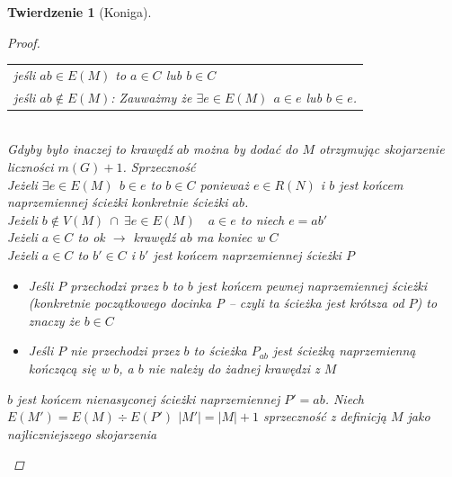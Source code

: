 \documentclass[12pt,a4paper]{article}
\newtheorem{tw}{Twierdzenie}
\theoremstyle{definition}
\begin{document}
\begin{tw}[Koniga]
\begin{proof}
\begin{enumerate}
\begin{tabular}{l}
		jeśli $ab\in E(M)$ to $a\in C$ lub $b\in C$	\\
		jeśli $ab\not\in E(M)$: Zauważmy że $\exists e\in E(M) ~~ a\in e$ lub $b\in e$.
	\end{tabular}\\
	 Gdyby było inaczej to krawędź $ab$ można by dodać do $M$ otrzymując skojarzenie liczności $m(G)+1$. Sprzeczność \\
	 Jeżeli $\exists e\in E(M) ~~ b\in e $ to $b\in C$ ponieważ $e\in R(N)$ i $b$ jest końcem naprzemiennej ścieżki konkretnie ścieżki $ab$.\\
	 Jeżeli $b\not\in V(M)~ \cap ~\exists e\in E(M) \quad a\in e$ to niech $e = ab'$\\
	 Jeżeli $a\in C$ to ok $\rightarrow$ krawędź $ab$ ma koniec w $C$\\
	 Jeżeli $a\in C$ to  $b'\in C$ i $b'$ jest końcem naprzemiennej ścieżki $P$
	 \begin{itemize}
	 	\item Jeśli $P$ przechodzi przez $b$ to $b$ jest końcem pewnej naprzemiennej ścieżki (konkretnie początkowego docinka P -- czyli ta ścieżka jest krótsza od $P$) to znaczy że $b\in C$
	 	\item Jeśli $P$ nie przechodzi przez $b$ to ścieżka $P_{ab}$ jest ścieżką naprzemienną kończącą się w $b$, a $b$ nie należy do żadnej krawędzi z $M$
	 \end{itemize}
	 $b$ jest końcem nienasyconej ścieżki naprzemiennej $P'=ab$. Niech $E(M') = E(M) \div E(P')$
	 $|M'| = |M| + 1$ sprzeczność z definicją $M$ jako najliczniejszego skojarzenia
\end{enumerate}
\end{proof}
\end{tw}
\end{document}
